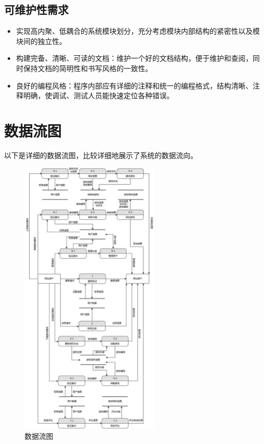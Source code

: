 \documentclass[12pt]{ctexart} %
\begin{document}
\subsection{可维护性需求}
\begin{itemize}
  \item 实现高内聚、低耦合的系统模块划分，充分考虑模块内部结构的紧密性以及模块间的独立性。
  \item 构建完备、清晰、可读的文档：维护一个好的文档结构，便于维护和查阅，同时保持文档的简明性和书写风格的一致性。
  \item 良好的编程风格：程序内部应有详细的注释和统一的编程格式，结构清晰、注释明确，使调试、测试人员能快速定位各种错误。
\end{itemize}

\section{数据流图}

以下是详细的数据流图，比较详细地展示了系统的数据流向。

\begin{figure}[H]
  \centering
  \includegraphics[width=0.6\textwidth]{dataflow.jpg}
  \caption{数据流图}
\end{figure}
\end{document}
